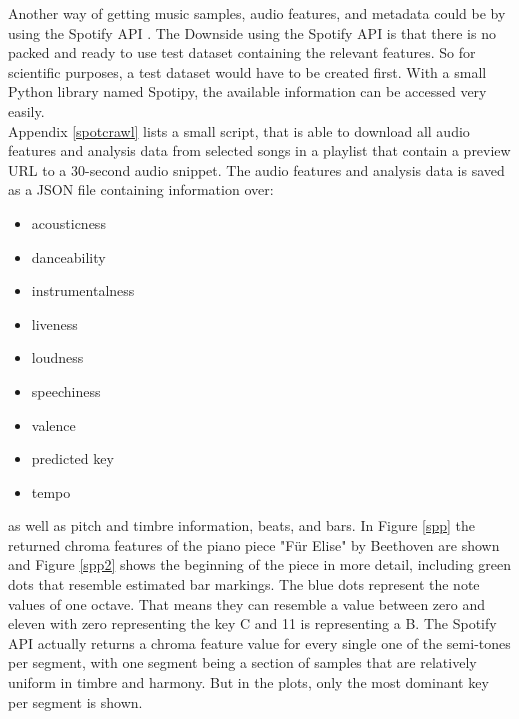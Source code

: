 Another way of getting music samples, audio features, and metadata could be by using the Spotify API \cite{spotifyapi1}.
The Downside using the Spotify API is that there is no packed and ready to use test dataset containing the relevant features. So for scientific purposes, a test dataset would have to be created first. With a small Python library named Spotipy, the available information can be accessed very easily. \cite{spotipy1}\\
Appendix \ref{spotcrawl} lists a small script, that is able to download all audio features and analysis data from selected songs in a playlist that contain a preview URL to a 30-second audio snippet. The audio features and analysis data is saved as a JSON file containing information over:
\begin{itemize}
	\setlength\itemsep{-0.5em}
	\item acousticness
	\item danceability
	\item instrumentalness
	\item liveness
	\item loudness
	\item speechiness
	\item valence
	\item predicted key
	\item tempo 
\end{itemize}
as well as pitch and timbre information, beats, and bars.
In Figure \ref{spp} the returned chroma features of the piano piece "Für Elise" by Beethoven are shown and Figure \ref{spp2} shows the beginning of the piece in more detail, including green dots that resemble estimated bar markings. The blue dots represent the note values of one octave. That means they can resemble a value between zero and eleven with zero representing the key C and 11 is representing a B. The Spotify API actually returns a chroma feature value for every single one of the semi-tones per segment, with one segment being a section of samples that are relatively uniform in timbre and harmony. But in the plots, only the most dominant key per segment is shown.
